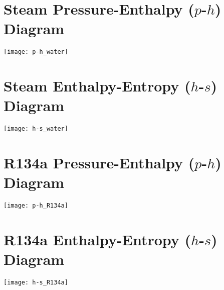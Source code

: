 \renewcommand{\thechapter}{\Alph{chapter}}
\renewcommand{\thesection}{\Alph{chapter}.\arabic{section}}

\appendixpage






\restoregeometry

\section{Steam Pressure-Enthalpy ($p$-$h$) Diagram} \label{app:phsteam}
\begin{center}
  \texttt{[image: p-h\_water]}
\end{center}

\section{Steam Enthalpy-Entropy ($h$-$s$) Diagram}
\begin{center}
  \texttt{[image: h-s\_water]}
\end{center}
\restoregeometry



\restoregeometry

\section{R134a Pressure-Enthalpy ($p$-$h$) Diagram} \label{app:phr134a}
\begin{center}
  \texttt{[image: p-h\_R134a]}
\end{center}
\section{R134a Enthalpy-Entropy ($h$-$s$) Diagram}
\begin{center}
  \texttt{[image: h-s\_R134a]}
\end{center}
\restoregeometry

